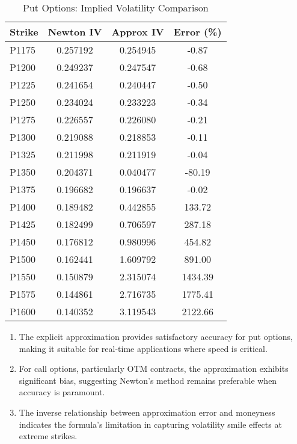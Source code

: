 \documentclass{article}
\begin{document}
\begin{table}[htbp]
\centering
\caption{Put Options: Implied Volatility Comparison}
\label{tab:put_iv}
\begin{tabular}{l S[table-format=1.6] S[table-format=1.6] S[table-format=-1.6]}
\toprule
Strike & {Newton IV} & {Approx IV} & {Error (\%)} \\
\midrule
P1175 & 0.257192 & 0.254945 & -0.87 \\
P1200 & 0.249237 & 0.247547 & -0.68 \\
P1225 & 0.241654 & 0.240447 & -0.50 \\
P1250 & 0.234024 & 0.233223 & -0.34 \\
P1275 & 0.226557 & 0.226080 & -0.21 \\
P1300 & 0.219088 & 0.218853 & -0.11 \\
P1325 & 0.211998 & 0.211919 & -0.04 \\
P1350 & 0.204371 & 0.040477 & -80.19 \\
P1375 & 0.196682 & 0.196637 & -0.02 \\
P1400 & 0.189482 & 0.442855 & 133.72 \\
P1425 & 0.182499 & 0.706597 & 287.18 \\
P1450 & 0.176812 & 0.980996 & 454.82 \\
P1500 & 0.162441 & 1.609792 & 891.00 \\
P1550 & 0.150879 & 2.315074 & 1434.39 \\
P1575 & 0.144861 & 2.716735 & 1775.41 \\
P1600 & 0.140352 & 3.119543 & 2122.66 \\
\bottomrule
\end{tabular}
\end{table}

\begin{enumerate}
\item The explicit approximation provides satisfactory accuracy for put options, making it suitable for real-time applications where speed is critical.

\item For call options, particularly OTM contracts, the approximation exhibits significant bias, suggesting Newton's method remains preferable when accuracy is paramount.

\item The inverse relationship between approximation error and moneyness indicates the formula's limitation in capturing volatility smile effects at extreme strikes.
\end{enumerate}
\end{document}
